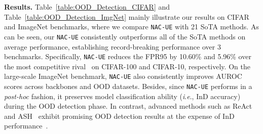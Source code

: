 \documentclass{article} \usepackage{iclr2024_conference,times}
\newcommand{\ie}{\textit{i}.\textit{e}.}
\newcommand{\bfstart}[1]{\noindent\textbf{#1.}}
\begin{document}
\bfstart{Results} 
Table~\ref{table:OOD_Detection_CIFAR} and Table~\ref{table:OOD_Detection_ImgNet} mainly illustrate our results on CIFAR and ImageNet benchmarks, where we compare \texttt{NAC-UE} with 21 SoTA methods.
As can be seen, our \texttt{NAC-UE} consistently outperforms all of the SoTA methods on average performance, establishing record-breaking performance over 3 benchmarks. Specifically, \texttt{NAC-UE} reduces the FPR95 by 10.60\% and 5.96\% over the most competitive rival~\citep{OOD_Detect:ViM,OOD_Detect:KNN} on CIFAR-100 and CIFAR-10, respectively. 
On the large-scale ImageNet benchmark, \texttt{NAC-UE} also consistently improves AUROC scores 
across backbones and OOD datasets.
Besides, since \texttt{NAC-UE} performs in a \textit{post-hoc} fashion, it preserves model classification ability (\ie, InD accuracy) during the OOD detection phase. In contrast, advanced methods such as ReAct~\citep{OOD_Detect:ReAct} and ASH~\citep{OOD_Detect:SimpleAct} exhibit promising OOD detection results at the expense of InD performance~\citep{OOD_Detect:SimpleAct}.
\end{document}
